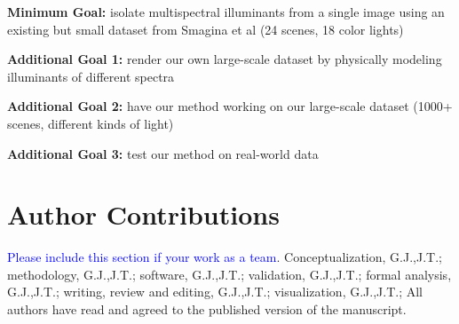 \documentclass[final]{cvpr}
\begin{document}
\textbf{Minimum Goal:} isolate multispectral illuminants from a single image using an existing but small dataset from Smagina et al (24 scenes, 18 color lights)

\textbf{Additional Goal 1:} render our own large-scale dataset by physically modeling illuminants of different spectra

\textbf{Additional Goal 2:} have our method working on our large-scale dataset (1000+ scenes, different kinds of light)

\textbf{Additional Goal 3:} test our method on real-world data


\section{Author Contributions}
\textcolor{blue}{Please include this section if your work as a team}.
Conceptualization, G.J.,J.T.; methodology, G.J.,J.T.; software, G.J.,J.T.; validation, G.J.,J.T.; formal analysis, G.J.,J.T.; writing, review and editing, G.J.,J.T.; visualization, G.J.,J.T.; All authors have read and agreed to the published version of the manuscript.




{\small


}
\end{document}

